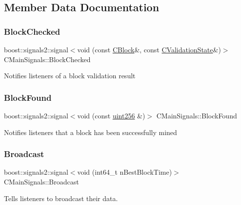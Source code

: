 \subsection{Member Data Documentation}
\mbox{\label{struct_c_main_signals_a9419bb09211f46bdc7f214e9d94f1bd7}} 
\subsubsection{\texorpdfstring{BlockChecked}{BlockChecked}}
{\footnotesize\ttfamily boost\+::signals2\+::signal$<$void (const \mbox{\hyperlink{class_c_block}{C\+Block}}\&, const \mbox{\hyperlink{class_c_validation_state}{C\+Validation\+State}}\&)$>$ C\+Main\+Signals\+::\+Block\+Checked}

Notifies listeners of a block validation result \mbox{\label{struct_c_main_signals_a27cc5668c440a9d451f7f661370dbc61}} 
\subsubsection{\texorpdfstring{BlockFound}{BlockFound}}
{\footnotesize\ttfamily boost\+::signals2\+::signal$<$void (const \mbox{\hyperlink{classuint256}{uint256}} \&)$>$ C\+Main\+Signals\+::\+Block\+Found}

Notifies listeners that a block has been successfully mined \mbox{\label{struct_c_main_signals_a57ba54e641838bc03d0bbda30796c0c9}} 
\subsubsection{\texorpdfstring{Broadcast}{Broadcast}}
{\footnotesize\ttfamily boost\+::signals2\+::signal$<$void (int64\+\_\+t n\+Best\+Block\+Time)$>$ C\+Main\+Signals\+::\+Broadcast}

Tells listeners to broadcast their data. \mbox{\label{struct_c_main_signals_a2f8f94d91265dc946e97614042698a7b}} 
